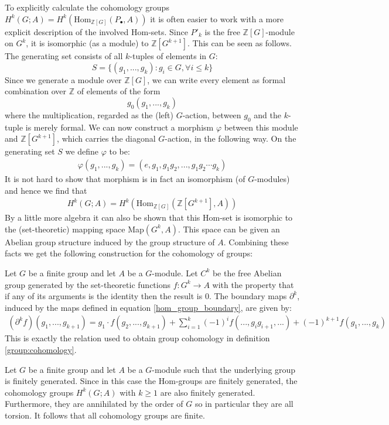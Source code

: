	To explicitly calculate the cohomology groups $H^k(G; A) = H^k(\text{Hom}_{\mathbb{Z}[G]}(P_\bullet, A))$ it is often easier to work with a more explicit description of the involved Hom-sets. Since $P'_k$ is the free $\mathbb{Z}[G]$-module on $G^k$, it is isomorphic (as a module) to $\mathbb{Z}[G^{k+1}]$. This can be seen as follows. The generating set consists of all $k$-tuples of elements in $G$: \[S = \{(g_1, ..., g_k): g_i\in G, \forall i\leq k\}\] Since we generate a module over $\mathbb{Z}[G]$, we can write every element as formal combination over $\mathbb{Z}$ of elements of the form \[g_0(g_1, ..., g_k)\] where the multiplication, regarded as the (left) $G$-action, between $g_0$ and the $k$-tuple is merely formal. We can now construct a morphism $\varphi$ between this module and $\mathbb{Z}[G^{k+1}]$, which carries the diagonal $G$-action, in the following way. On the generating set $S$ we define $\varphi$ to be:
	\begin{gather}
		\varphi(g_1, ..., g_k) = (e, g_1, g_1g_2, ..., g_1g_2\cdots g_k)
	\end{gather}
	It is not hard to show that morphism is in fact an isomorphism (of $G$-modules) and hence we find that
	\begin{gather}
		H^k(G; A) = H^k(\text{Hom}_{\mathbb{Z}[G]}(\mathbb{Z}[G^{k+1}], A))
	\end{gather}
	By a little more algebra it can also be shown that this Hom-set is isomorphic to the (set-theoretic) mapping space Map$(G^k, A)$. This space can be given an Abelian group structure induced by the group structure of $A$. Combining these facts we get the following construction for the cohomology of groups:
	\begin{construct}
		Let $G$ be a finite group and let $A$ be a $G$-module. Let $C^k$ be the free Abelian group generated by the set-theoretic functions $f:G^k\rightarrow A$ with the property that if any of its arguments is the identity then the result is 0. The boundary maps $\partial^k$, induced by the maps defined in equation \ref{hom_group_boundary}, are given by:
		\begin{gather}
			(\partial^k f)(g_1, ..., g_{k+1}) = g_1\cdot f(g_2, ..., g_{k+1}) + \sum_{i=1}^k(-1)^if(..., g_ig_{i+1}, ...) + (-1)^{k+1}f(g_1, ..., g_k)
		\end{gather}
		This is exactly the relation used to obtain group cohomology in definition \ref{group:cohomology}.
	\end{construct}
	
	\begin{property}[Finiteness]
		Let $G$ be a finite group and let $A$ be a $G$-module such that the underlying group is finitely generated. Since in this case the Hom-groups are finitely generated, the cohomology groups $H^k(G; A)$ with $k\geq1$ are also finitely generated. Furthermore, they are annihilated by the order of $G$ so in particular they are all torsion. It follows that all cohomology groups are finite.
	\end{property}

